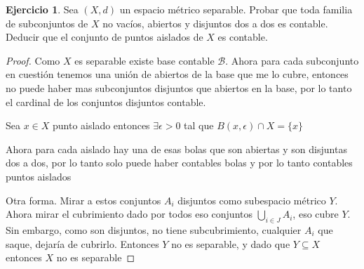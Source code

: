 \documentclass[11pt]{report}
\theoremstyle{definition}
\newtheorem{ej}{Ejercicio}
\begin{document}
\begin{ej}
	Sea $(X,d)$ un espacio métrico separable. Probar que toda familia de subconjuntos de $X$ no vacíos, abiertos y disjuntos dos a dos es contable. Deducir que el conjunto de puntos aislados de $X$ es contable.
	\begin{proof}
		Como $X$ es separable existe base contable $\mathcal{B}$. Ahora para cada subconjunto en cuestión tenemos una unión de abiertos de la base que me lo cubre, entonces no puede haber mas subconjuntos disjuntos que abiertos en la base, por lo tanto el cardinal de los conjuntos disjuntos contable.

		Sea $x \in X$ punto aislado entonces $\exists \epsilon >0$ tal que $B(x,\epsilon) \cap X = \{x\}$

		Ahora para cada aislado hay una de esas bolas que son abiertas y son disjuntas dos a dos, por lo tanto solo puede haber contables bolas y por lo tanto contables puntos aislados

		Otra forma. Mirar a estos conjuntos $A_i$ disjuntos como subespacio métrico $Y$. Ahora mirar el cubrimiento dado por todos eso conjuntos $\bigcup_{i \in J} A_i$, eso cubre $Y$. Sin embargo, como son disjuntos, no tiene subcubrimiento, cualquier $A_i$ que saque, dejaría de cubrirlo. Entonces $Y$ no es separable, y dado que $Y \subseteq X$ entonces $X$ no es separable
	\end{proof}
\end{ej}
\end{document}
